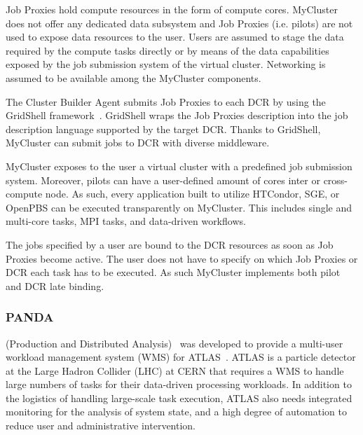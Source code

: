 \documentclass{sig-alternate}
\begin{document}
Job Proxies hold compute resources in the form of compute cores. MyCluster does
not offer any dedicated data subsystem and Job Proxies (i.e. pilots) are not
used to expose data resources to the user. Users are assumed to stage the data
required by the compute tasks directly or by means of the data capabilities
exposed by the job submission system of the virtual cluster. Networking is
assumed to be available among the MyCluster components.

The Cluster Builder Agent submits Job Proxies to each DCR by using the GridShell
framework~\cite{walker2004gridshell}. GridShell wraps the Job Proxies
description into the job description language supported by the target DCR.
Thanks to GridShell, MyCluster can submit jobs to DCR with diverse middleware.

MyCluster exposes to the user a virtual cluster with a predefined job submission
system. Moreover, pilots can have a user-defined amount of cores inter or
cross-compute node. As such, every application built to utilize HTCondor, SGE,
or OpenPBS can be executed transparently on MyCluster. This includes single and
multi-core tasks, MPI tasks, and data-driven workflows.

The jobs specified by a user are bound to the DCR resources as soon as Job
Proxies become active. The user does not have to specify on which Job Proxies or
DCR each task has to be executed. As such MyCluster implements both pilot and
DCR late binding.

%
\subsubsection{PANDA}
\label{sec:panda}

\panda (Production and Distributed Analysis)~\cite{zhao2011panda} was
developed to provide a multi-user workload management system (WMS) for
ATLAS~\cite{aad2008atlas}. ATLAS is a particle detector at the Large Hadron
Collider (LHC) at CERN that requires a WMS to handle large numbers of tasks for
their data-driven processing workloads. In addition to the logistics of handling
large-scale task execution, ATLAS also needs integrated monitoring for the
analysis of system state, and a high degree of automation to reduce user and
administrative intervention.
\end{document}
